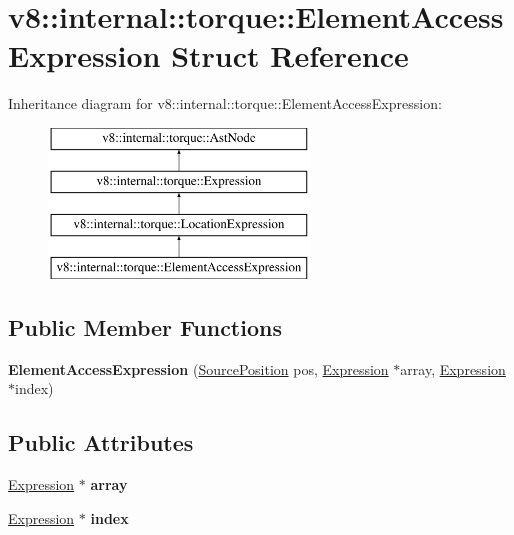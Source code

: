 \hypertarget{structv8_1_1internal_1_1torque_1_1ElementAccessExpression}{}\section{v8\+:\+:internal\+:\+:torque\+:\+:Element\+Access\+Expression Struct Reference}
\label{structv8_1_1internal_1_1torque_1_1ElementAccessExpression}
Inheritance diagram for v8\+:\+:internal\+:\+:torque\+:\+:Element\+Access\+Expression\+:\begin{figure}[H]
\begin{center}
\leavevmode
\includegraphics[height=4.000000cm]{structv8_1_1internal_1_1torque_1_1ElementAccessExpression}
\end{center}
\end{figure}
\subsection*{Public Member Functions}
\begin{DoxyCompactItemize}
\item 
\mbox{\label{structv8_1_1internal_1_1torque_1_1ElementAccessExpression_a5709a49b3eac95b3ee51e7b643e4c262}} 
{\bfseries Element\+Access\+Expression} (\mbox{\hyperlink{structv8_1_1internal_1_1torque_1_1SourcePosition}{Source\+Position}} pos, \mbox{\hyperlink{structv8_1_1internal_1_1torque_1_1Expression}{Expression}} $\ast$array, \mbox{\hyperlink{structv8_1_1internal_1_1torque_1_1Expression}{Expression}} $\ast$index)
\end{DoxyCompactItemize}
\subsection*{Public Attributes}
\begin{DoxyCompactItemize}
\item 
\mbox{\label{structv8_1_1internal_1_1torque_1_1ElementAccessExpression_af469a80a580197d04ff58b8e04f65171}} 
\mbox{\hyperlink{structv8_1_1internal_1_1torque_1_1Expression}{Expression}} $\ast$ {\bfseries array}
\item 
\mbox{\label{structv8_1_1internal_1_1torque_1_1ElementAccessExpression_afc533fe35b9c93ec89ec5e72179d858d}} 
\mbox{\hyperlink{structv8_1_1internal_1_1torque_1_1Expression}{Expression}} $\ast$ {\bfseries index}
\end{DoxyCompactItemize}
